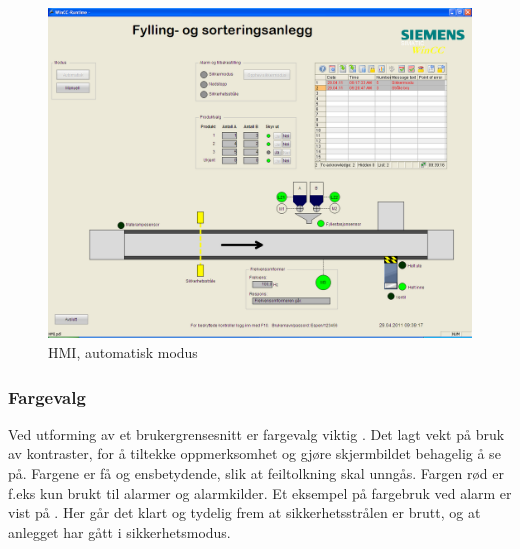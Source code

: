 \documentclass[Visionprosjekt.tex]{subfiles}
\begin{document}
\begin{figure}[ht]
	\centering
		\includegraphics[width=1.0\textwidth]{bilder/auto_kjorer}
	\caption{HMI, automatisk modus}
	\label{fig:auto_kjorer}
\end{figure}






\subsubsection{Fargevalg}

Ved utforming av et brukergrensesnitt er fargevalg viktig \cite{HMIstandard}.
Det lagt vekt på bruk av kontraster, for å tiltekke oppmerksomhet og gjøre skjermbildet behagelig å se på. Fargene er få og  ensbetydende, slik at feiltolkning skal unngås. Fargen rød er f.eks kun brukt til alarmer og alarmkilder.
Et eksempel på fargebruk ved alarm er vist på . Her går det klart og tydelig frem at sikkerhetsstrålen er brutt, og at anlegget har gått i sikkerhetsmodus.
\end{document}
